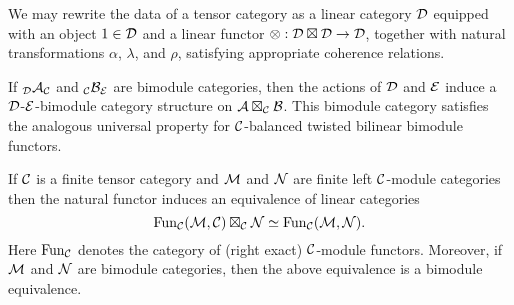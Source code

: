 \documentclass[a4paper]{amsart}
\begin{document}


\begin{remark} \label{rmk:rigidpreservedbytensor}
	We may rewrite the data  of a tensor category as a linear category $\mathcal D$ equipped with an object $1 \in \mathcal D$ and a linear functor $\otimes: \mathcal D \boxtimes \mathcal D \to \mathcal D $, together with natural transformations $\alpha$, $\lambda$, and $\rho$, satisfying appropriate coherence relations. %
\end{remark}

\begin{remark}
	If ${}_{\mathcal D}\mathcal A_{\mathcal C}$ and ${}_{\mathcal C}\mathcal B_{\mathcal E}$ are bimodule categories, then the actions of $\mathcal D$ and $\mathcal E$ induce a $\mathcal D$-$\mathcal E$-bimodule category structure on $\mathcal A \boxtimes_{\mathcal C} \mathcal B$. This bimodule category satisfies the analogous universal property for $\mathcal C$-balanced twisted bilinear bimodule functors. 
\end{remark}

\begin{lemma} \label{Lma:FunctorsAsATensorPdt}
	If $\mathcal C$ is a finite tensor category and $\mathcal M$ and $\mathcal N$ are finite left $\mathcal C$-module categories then the natural functor induces an equivalence of linear categories
	\begin{equation*}
		\operatorname{Fun}_\mathcal C(\mathcal M, \mathcal C) \boxtimes_\mathcal C \mathcal N \simeq \operatorname{Fun}_\mathcal C(\mathcal M,\mathcal N).
	\end{equation*} 
	Here $\operatorname{Fun}_\mathcal C$ denotes the category of (right exact) $\mathcal C$-module functors. 
	Moreover, if $\mathcal M$ and $\mathcal N$ are bimodule categories, then the above equivalence is a bimodule equivalence. 
\end{lemma}
\end{document}
